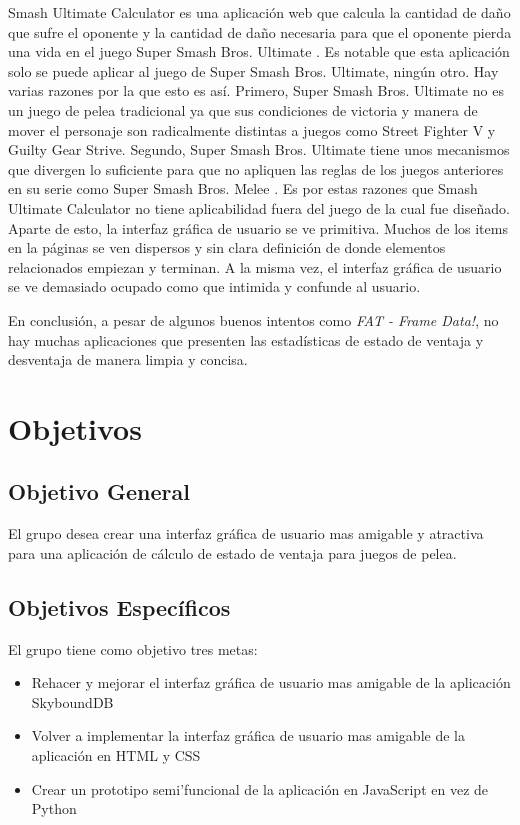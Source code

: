 Smash Ultimate Calculator es una aplicación web que calcula la cantidad de daño que sufre el oponente y la cantidad de daño necesaria para que el oponente pierda una vida en el juego Super Smash Bros. Ultimate \cite{noauthor_super_2022}. Es notable que esta aplicación solo se puede aplicar al juego de Super Smash Bros. Ultimate, ningún otro. Hay varias razones por la que esto es así. Primero, Super Smash Bros. Ultimate no es un juego de pelea tradicional ya que sus condiciones de victoria y manera de mover el personaje son radicalmente distintas a juegos como Street Fighter V y Guilty Gear Strive. Segundo, Super Smash Bros. Ultimate tiene unos mecanismos que divergen lo suficiente para que no apliquen las reglas de los juegos anteriores en su serie como Super Smash Bros. Melee \cite{noauthor_super_2022}. Es por estas razones que Smash Ultimate Calculator no tiene aplicabilidad fuera del juego de la cual fue diseñado. Aparte de esto, la interfaz gráfica de usuario se ve primitiva. Muchos de los items en la páginas se ven dispersos y sin clara definición de donde elementos relacionados empiezan y terminan. A la misma vez, el interfaz gráfica de usuario se ve demasiado ocupado como que intimida y confunde al usuario.

En conclusión, a pesar de algunos buenos intentos como \textit{FAT - Frame Data!}, no hay muchas aplicaciones que presenten las estadísticas de estado de ventaja y desventaja de manera limpia y concisa.

\section{Objetivos}

\subsection{Objetivo General} 

El grupo desea crear una interfaz gráfica de usuario mas amigable y atractiva para una aplicación de cálculo de estado de ventaja para juegos de pelea.

\subsection{Objetivos Específicos}

El grupo tiene como objetivo tres metas:
\begin{itemize}
    \item Rehacer y mejorar el interfaz gráfica de usuario mas amigable de la aplicación SkyboundDB \cite{aramis-matos_skybounddb_2022}
    \item Volver a implementar la interfaz gráfica de usuario mas amigable de la aplicación en HTML y CSS
    \item Crear un prototipo semi'funcional de la aplicación en JavaScript en vez de Python
\end{itemize}

